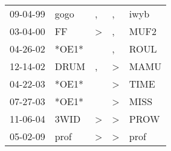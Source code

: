 \begin{supertabular}{lllll}
 09-04-99 &   gogo &             , &             , &  iwyb \\
 03-04-00 &     FF &  \textgreater &             , &  MUF2 \\
 04-26-02 &  *OE1* &               &             , &  ROUL \\
 12-14-02 &   DRUM &             , &  \textgreater &  MAMU \\
 04-22-03 &  *OE1* &               &  \textgreater &  TIME \\
 07-27-03 &  *OE1* &               &  \textgreater &  MISS \\
 11-06-04 &   3WID &  \textgreater &  \textgreater &  PROW \\
 05-02-09 &   prof &  \textgreater &  \textgreater &  prof \\
\end{supertabular}
